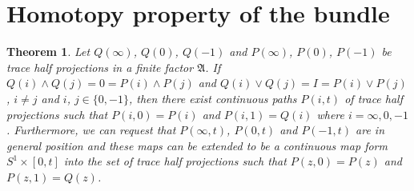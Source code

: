 \documentclass[a4paper,10pt]{amsart}
\newtheorem{theorem}{Theorem}[section]
\newcommand{\AAA}{\mathfrak A}
\begin{document}
\section{Homotopy property of the bundle}

\begin{theorem}
    Let $Q(\infty)$, $Q(0)$, $Q(-1)$ and $P(\infty)$, $P(0)$, $P(-1)$
    be trace half projections in a finite factor $\AAA$. If 
    $Q(i) \wedge Q(j) = 0 = P(i) \wedge P(j)$ and 
    $Q(i) \vee Q(j) = I = P(i) \vee P(j)$, $i\neq j$ and $i$, $j \in
    \{0, -1\}$, then
    there exist continuous paths $P(i, t)$ of trace half projections such
    that $P(i, 0) = P(i)$ and $P(i, 1) = Q(i)$ where $i = \infty, 0, -1$.
    Furthermore, we can request that $P(\infty, t)$, $P(0, t)$ and
    $P(-1, t)$ are in general position and these maps can be 
    extended to be a continuous map form $S^{1} \times [0,t]$ into 
    the set of trace half projections such
    that $P(z, 0) = P(z)$ and $P(z, 1) = Q(z)$.
\end{theorem}
\end{document}

